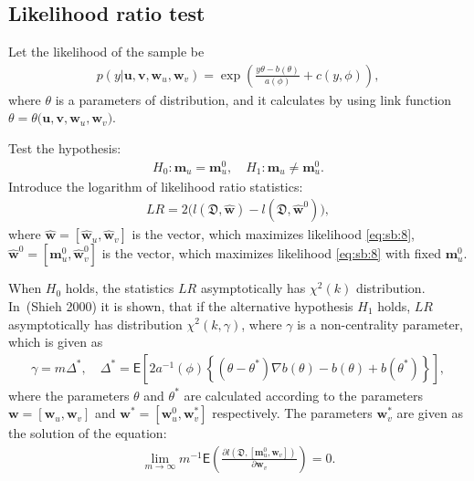 \documentclass[
11pt,%
tightenlines,%
twoside,%
onecolumn,%
nofloats,%
nobibnotes,%
nofootinbib,%
superscriptaddress,%
noshowpacs,%
centertags]%
{revtex4}
\begin{document}
\subsection{Likelihood ratio test}\label{likelihood_test}
Let the likelihood of the sample be
\begin{equation}
\label{eq:sb:8}
\begin{aligned}
	p(y|\textbf{u},\textbf{v},\textbf{w}_{u},\textbf{w}_{v}) = \exp\left(\frac{y\theta- b(\theta)}{a(\phi)} + c\left(y, \phi\right)\right),
\end{aligned}
\end{equation}
where $\theta$ is a parameters of distribution, and it calculates by using link function $\theta=\theta\bigr(\textbf{u},\textbf{v},\textbf{w}_{u},\textbf{w}_{v}\bigr)$.

Test the hypothesis:
\begin{equation}
\label{eq:sb:9}
\begin{aligned}
	H_0: \textbf{m}_{u} = \textbf{m}^0_{u}, \quad H_1: \textbf{m}_{u} \not= \textbf{m}^0_{u}.
\end{aligned}
\end{equation}
Introduce the logarithm of likelihood ratio statistics:
\begin{equation}
\label{eq:sb:10}
\begin{aligned}
	LR = 2\Big(l\left(\mathfrak{D}, \hat{\textbf{w}}\right) - l\left(\mathfrak{D}, \hat{\textbf{w}}^0\right)\Big),
\end{aligned}
\end{equation}
where $\hat{\textbf{w}} = [\hat{\textbf{w}}_{u},\hat{\textbf{w}}_{v}]$ is the vector, which maximizes likelihood \eqref{eq:sb:8}, $\hat{\textbf{w}}^{0} = [\textbf{m}^{0}_{u},\hat{\textbf{w}}^{0}_{v}]$ is the vector, which maximizes likelihood \eqref{eq:sb:8} with fixed $\textbf{m}^{0}_{u}$.
	
When $H_0$ holds, the statistics $LR$ asymptotically has $\chi^2(k)$ distribution. In~(Shieh 2000) it is shown, that if the alternative hypothesis $H_1$ holds, $LR$ asymptotically has distribution $\chi^2(k,\gamma)$, where $\gamma$ is a non-centrality parameter, which is given as
\begin{equation}
\label{eq:sb:11}
\begin{aligned}
	\gamma = m\Delta^*, \quad \Delta^* = \mathsf{E}\left[2a^{-1}(\phi)\left\{\left(\theta - \theta^*\right)\nabla b(\theta) - b(\theta) + b(\theta^*)\right\}\right], 
\end{aligned}
\end{equation}
where the parameters $\theta$ and $\theta^*$ are calculated according to the parameters $\textbf{w} = [\textbf{w}_{u}, \textbf{w}_{v}]$ and $\textbf{w}^* = [\textbf{w}^{0}_{u}, \textbf{w}^{*}_{v}]$ respectively. The parameters  $\textbf{w}^{*}_{v}$ are given as the solution of the equation:
\begin{equation}
\label{eq:sb:12}
\begin{aligned}
	\lim_{m\to\infty}m^{-1}\mathsf{E}\left(\frac{\partial l\left(\mathfrak{D}, \left[\textbf{m}^{0}_{u}, \textbf{w}_{v}\right]\right)}{\partial \textbf{w}_{v}}\right) = 0.
\end{aligned}
\end{equation}
	
\end{document}

